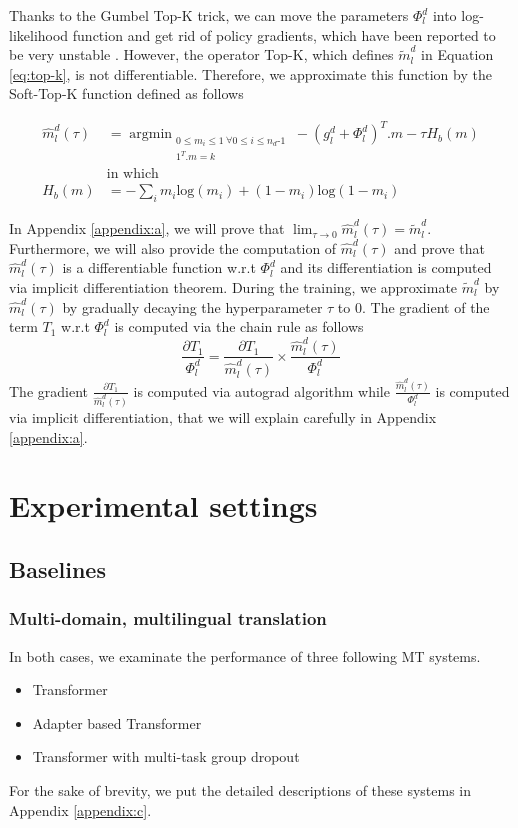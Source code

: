 \documentclass[11pt]{article}
\begin{document}
Thanks to the Gumbel Top-K trick, we can move the parameters $\Phi_l^d$ into log-likelihood function and get rid of policy gradients, which have been reported to be very unstable \citep{Diederick14auto}. However, the operator Top-K, which defines $\tilde{m}_l^d$ in Equation \eqref{eq:top-k}, is not differentiable. Therefore, we approximate this function by the Soft-Top-K function defined as follows

\begin{align}
\hat{m}_l^d(\tau) &= \displaystyle{\mathop{argmin}_{\substack{
       0 \leqslant m_i \leqslant 1 \ \forall 0 \leqslant i \leqslant n_d\text{-}1 \label{eq:soft-top-k}\\
        1^{T}.m = k
      }}} -(g_l^d+\Phi_l^d)^{T} . m - \tau H_b(m) \\
& \text{in which} \nonumber \\
H_b(m) &= - \sum_i m_i \text{log}(m_i) + (1-m_i)\text{log}(1-m_i) \nonumber 
\end{align}

In Appendix \ref{appendix:a}, we will prove that $\lim_{\tau \rightarrow 0}\hat{m}_l^d(\tau) = \tilde{m}_l^d$. Furthermore, we will also provide the computation of $\hat{m}_l^d(\tau)$ and prove that $\hat{m}_l^d(\tau)$ is a differentiable function w.r.t $\Phi_l^d$ and its differentiation is computed via implicit differentiation theorem. During the training, we approximate $\tilde{m}_l^d$ by $\hat{m}_l^d(\tau)$ by gradually decaying the hyperparameter $\tau$ to $0$. The gradient of the term $T_1$ w.r.t $\Phi_l^d$ is computed via the chain rule as follows
\begin{equation}
\frac{\partial T_1}{\Phi_l^d} = \frac{\partial T_1}{\hat{m}_l^d(\tau)} \times \frac{\hat{m}_l^d(\tau)}{\Phi_l^d}
\end{equation}
The gradient $\frac{\partial T_1}{\hat{m}_l^d(\tau)}$ is computed via autograd algorithm while $\frac{\hat{m}_l^d(\tau)}{\Phi_l^d}$ is computed via implicit differentiation, that we will explain carefully in Appendix \ref{appendix:a}.
\section{Experimental settings}
\subsection{Baselines}
\subsubsection{Multi-domain, multilingual translation}
In both cases, we examinate the performance of three following MT systems.
\begin{itemize}
	\item Transformer
	\item Adapter based Transformer
	\item Transformer with multi-task group dropout
\end{itemize}
For the sake of brevity, we put the detailed descriptions of these systems in Appendix \ref{appendix:c}.
\end{document}
